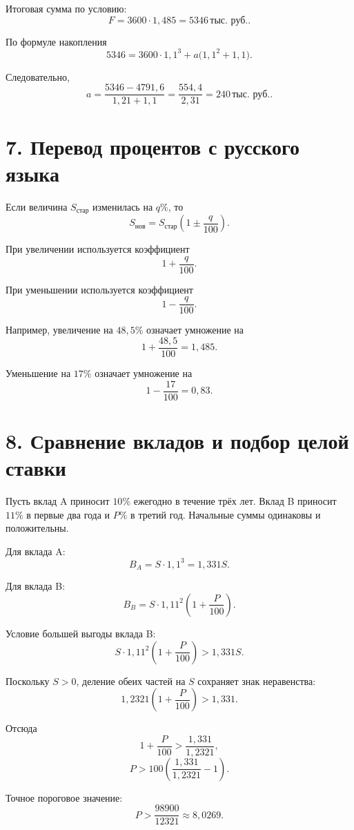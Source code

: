 \documentclass[a4paper,12pt]{article}
\newcommand{\thrub}{\,\text{тыс. руб.}}
\begin{document}
Итоговая сумма по условию:
\[
  F
  =
  3600\cdot1{,}485
  =
  5346\thrub.
\]

По формуле накопления
\[
  5346
  =
  3600\cdot1{,}1^3
  +
  a\bigl(1{,}1^2+1{,}1\bigr).
\]

Следовательно,
\[
  a
  =
  \frac{5346-4791{,}6}{1{,}21+1{,}1}
  =
  \frac{554{,}4}{2{,}31}
  =
  \boxed{240\thrub}.
\]

\section*{7. Перевод процентов с русского языка}

Если величина \(S_{\text{стар}}\) изменилась на \(q\%\), то
\[
  S_{\text{нов}}
  =
  S_{\text{стар}}
  \left(
    1\pm\frac{q}{100}
  \right).
\]

При увеличении используется коэффициент
\[
  1+\frac{q}{100}.
\]

При уменьшении используется коэффициент
\[
  1-\frac{q}{100}.
\]

Например, увеличение на \(48{,}5\%\) означает умножение на
\[
  1+\frac{48{,}5}{100}
  =
  1{,}485.
\]

Уменьшение на \(17\%\) означает умножение на
\[
  1-\frac{17}{100}
  =
  0{,}83.
\]

\section*{8. Сравнение вкладов и подбор целой ставки}

Пусть вклад A приносит \(10\%\) ежегодно в течение трёх лет.
Вклад B приносит \(11\%\) в первые два года и \(P\%\) в третий год.
Начальные суммы одинаковы и положительны.

Для вклада A:
\[
  B_A
  =
  S\cdot1{,}1^3
  =
  1{,}331S.
\]

Для вклада B:
\[
  B_B
  =
  S\cdot1{,}11^2
  \left(
    1+\frac{P}{100}
  \right).
\]

Условие большей выгоды вклада B:
\[
  S\cdot1{,}11^2
  \left(
    1+\frac{P}{100}
  \right)
  >
  1{,}331S.
\]

Поскольку \(S>0\), деление обеих частей на \(S\) сохраняет знак
неравенства:
\[
  1{,}2321
  \left(
    1+\frac{P}{100}
  \right)
  >
  1{,}331.
\]

Отсюда
\[
  1+\frac{P}{100}
  >
  \frac{1{,}331}{1{,}2321},
\]
\[
  P
  >
  100
  \left(
    \frac{1{,}331}{1{,}2321}-1
  \right).
\]

Точное пороговое значение:
\[
  P
  >
  \frac{98900}{12321}
  \approx
  8{,}0269.
\]
\end{document}
